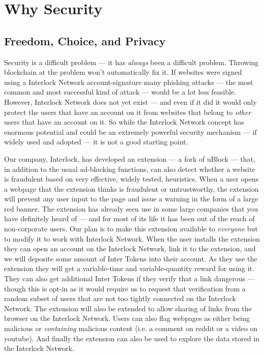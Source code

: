 \documentclass[a4paper]{article}
\begin{document}
\section{Why Security}
\label{Why Security}
\subsection{Freedom, Choice, and Privacy}
\label{Freedom, Choice, and Privacy}

Security is a difficult problem ---  it has \emph{always} been a difficult problem. Throwing blockchain at the problem won't automatically fix it. If websites were signed using a Interlock Network account-signature many phishing attacks ---  the most common and most successful kind of attack ---  would be a lot less feasible. However, Interlock Network does not yet exist ---  and even if it did it would only protect the users that have an account on it from websites that belong to \emph{other} users that have an account on it. So while the Interlock Network concept has enormous potential and could be an extremely powerful security mechanism ---  if widely used and adopted ---  it is not a good starting point.

Our company, Interlock, has developed an extension ---  a fork of uBlock ---  that, in addition to the usual ad-blocking functions, can also detect whether a website is fraudulent based on very effective, widely tested, heuristics. When a user opens a webpage that the extension thinks is fraudulent or untrustworthy, the extension will prevent any user input to the page and issue a warning in the form of a large red banner. The extension has already seen use in some large companies that you have definitely heard of ---  and for most of its life it has been out of the reach of non-corporate users. Our plan is to make this extension available to \emph{everyone} but to modify it to work with Interlock Network. When the user installs the extension they can open an account on the Interlock Network, link it to the extension, and we will deposite some amount of Inter Tokens into their account. As they use the extension they will get a variable-time and variable-quantity reward for using it. They can also get additional Inter Tokens if they verify that a link dangerous ---  though this is opt-in as it would require us to request that verification from a random subset of users that are not too tightly connected on the Interlock Network. The extension will also be extended to allow sharing of links from the browser on the Interlock Network. Users can also flag webpages as either being malicious or \emph{containing} malicious content (i.e. a comment on reddit or a video on youtube). And finally the extension can also be used to explore the data stored in the Interlock Network.
\end{document}
